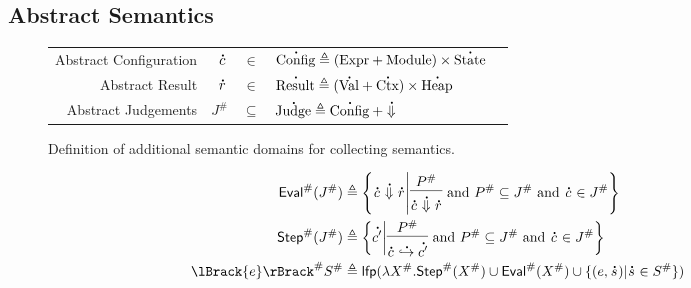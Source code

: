 \documentclass{article}
\theoremstyle{definition}
\newcommand*{\A}[1]{\overset{{\,_{\mbox{\Large .}}}}{#1}}
\newcommand*{\Abs}[1]{{#1}^{\#}}
\newcommand*{\Expr}{\text{Expr}}
\newcommand*{\Module}{\text{Module}}
\newcommand*{\Ctx}{\text{Ctx}}
\newcommand*{\Value}{\text{Val}}
\newcommand*{\Mem}{\text{Heap}}
\newcommand*{\Config}{\text{Config}}
\newcommand*{\State}{\text{State}}
\newcommand*{\Result}{\text{Result}}
\newcommand*{\Judge}{\text{Judge}}
\newcommand*{\lfp}{\mathsf{lfp}}
\newcommand*{\Step}{\mathsf{Step}}
\newcommand*{\Eval}{\mathsf{Eval}}
\newcommand*{\semarrow}{\hookrightarrow}
\newcommand*{\sembracket}[1]{\lBrack{#1}\rBrack}
\begin{document}
\subsection{Abstract Semantics}
\begin{figure}[h!]
  \centering
  \begin{tabular}{rrcll}
    Abstract Configuration & $\A{c}$   & $\in$       & $\A\Config\triangleq(\Expr+\Module)\times\A\State$ \\
    Abstract Result        & $\A{r}$   & $\in$       & $\A\Result\triangleq(\A\Value+\A\Ctx)\times\A\Mem$ \\
    Abstract Judgements    & $\Abs{J}$ & $\subseteq$ & $\A\Judge\triangleq\A\Config\:+\A\Downarrow$
  \end{tabular}
  \caption{Definition of additional semantic domains for collecting semantics.}
  \label{fig:abscoldom}
\end{figure}
\begin{align*}
  \Abs\Eval(\Abs{J})          & \triangleq
  \left\{\A{c}\A\Downarrow\A{r}\middle|
  \begin{prooftree}[center=true]
    \hypo{\Abs{P}}\infer1{\A{c}\A\Downarrow\A{r}}
  \end{prooftree}\text{ and }
  \Abs{P}\subseteq\Abs{J}\text{ and }\A{c}\in\Abs{J}
  \right\}                                 \\
  \Abs\Step(\Abs{J})          & \triangleq
  \left\{\A{c'}\middle|
  \begin{prooftree}[center=true]
    \hypo{\Abs{P}}\infer1{\A{c}\A\semarrow\A{c'}}
  \end{prooftree}\text{ and }
  \Abs{P}\subseteq\Abs{J}\text{ and }\A{c}\in\Abs{J}
  \right\}                                 \\
  \Abs{\sembracket{e}}\Abs{S} & \triangleq
  \lfp(\lambda \Abs{X}.\Abs\Step(\Abs{X})\cup\Abs\Eval(\Abs{X})\cup\{(e,\A{s})|\A{s}\in\Abs{S}\})
\end{align*}
\end{document}
